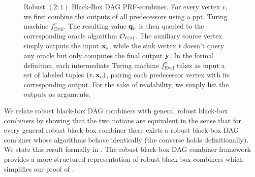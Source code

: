 \begin{figure}[htbp]
    \caption{Robust $(2;1)$ Black-Box DAG PRF-combiner. For every vertex $v$, we first combine the outputs of all predecessors using a ppt. Turing machine $f_{\text{Eval}}^{v}$. The resulting value $\mathbf{q}_v$ is then queried to the corresponding oracle algorithm $\mathcal{O}_{\ell(v)}$. The auxiliary source vertex simply outputs the input $\mathbf{x}_s$, while the sink vertex $t$ doesn't query any oracle but only computes the final output $\mathbf{y}$.
    In the formal definition, each intermediate Turing machine $f_{\text{Eval}}^v$ takes as input a set of labeled tuples $(v, \mathbf{x}_v)$, pairing each predecessor vertex with its corresponding output.
    For the sake of readability, we simply list the outputs as arguments.}
    \label{fig:prf_dag_comb}
\end{figure}

We relate robust black-box DAG combiners with general robust black-box combiners by showing that the two notions are 
equivalent in the sense that for every general robust black-box combiner there exists 
a robust black-box DAG combiner whose algorithms behave identically (the converse holds definitionally).
We state this result formally in . The robust black-box DAG combiner 
framework provides a more structured representation of robust black-box combiners which simplifies our proof of 
.

